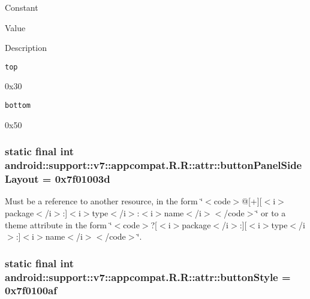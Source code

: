Constant

Value

Description 

{\tt top}

0x30

{\tt bottom}

0x50\hypertarget{classandroid_1_1support_1_1v7_1_1appcompat_1_1_r_1_1attr_67874a52ac270d7b9a5c3cdbe5094cb2}{
\subsubsection[{buttonPanelSideLayout}]{\setlength{\rightskip}{0pt plus 5cm}static final int android::support::v7::appcompat.R.R::attr::buttonPanelSideLayout = 0x7f01003d}}
\label{classandroid_1_1support_1_1v7_1_1appcompat_1_1_r_1_1attr_67874a52ac270d7b9a5c3cdbe5094cb2}


Must be a reference to another resource, in the form \char`\"{}$<$code$>$@\mbox{[}+\mbox{]}\mbox{[}$<$i$>$package$<$/i$>$:\mbox{]}$<$i$>$type$<$/i$>$:$<$i$>$name$<$/i$>$$<$/code$>$\char`\"{} or to a theme attribute in the form \char`\"{}$<$code$>$?\mbox{[}$<$i$>$package$<$/i$>$:\mbox{]}\mbox{[}$<$i$>$type$<$/i$>$:\mbox{]}$<$i$>$name$<$/i$>$$<$/code$>$\char`\"{}. \hypertarget{classandroid_1_1support_1_1v7_1_1appcompat_1_1_r_1_1attr_b1ea71473584e24432c9a1646f717398}{
\subsubsection[{buttonStyle}]{\setlength{\rightskip}{0pt plus 5cm}static final int android::support::v7::appcompat.R.R::attr::buttonStyle = 0x7f0100af}}
\label{classandroid_1_1support_1_1v7_1_1appcompat_1_1_r_1_1attr_b1ea71473584e24432c9a1646f717398}


